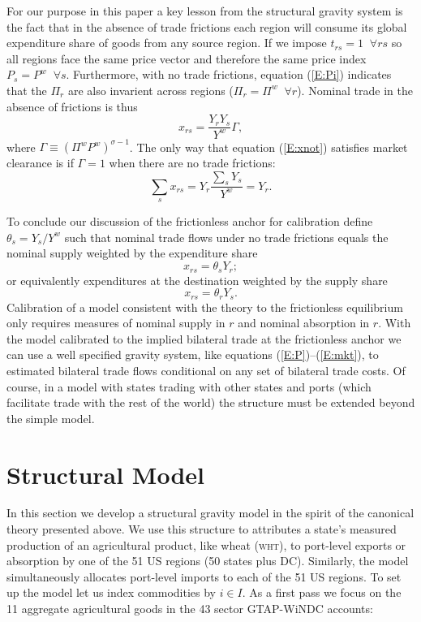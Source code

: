 \documentclass{ejb}
\begin{document}
For our purpose in this paper a key lesson from the structural gravity
system is the fact that in the absence of trade frictions each region
will consume its global expenditure share of goods from any source
region. If we impose $t_{rs}=1 \;\; \forall rs$ so all regions face
the same price vector and therefore the same price index $P_s = P^w
\;\; \forall s$.  Furthermore, with no trade frictions, equation
(\ref{E:Pi}) indicates that the $\Pi_r$ are also invarient across
regions ($\Pi_r = \Pi^w \;\; \forall r$). Nominal trade in the 
absence of frictions is thus 
\begin{equation}
\label{E:xnot}
x_{rs} = \frac{Y_r Y_s}{Y^w} \Gamma,
\end{equation}
where $\Gamma \equiv (\Pi^w P^w)^{\sigma-1}$.  The only way that
equation (\ref{E:xnot}) satisfies market clearance is if $\Gamma = 1$
when there are no trade frictions:
\[\sum_s x_{rs} = Y_r \frac{\sum_s Y_s}{Y^w} = Y_r.\]

To conclude our discussion of the frictionless anchor for calibration
define $\theta_s = Y_s/Y^w$ such that nominal trade flows under no
trade frictions equals the nominal supply weighted by the expenditure
share
\begin{equation}
x_{rs} = \theta_s Y_r;
\end{equation}
or equivalently expenditures at the destination weighted by the supply
share
\begin{equation}
x_{rs} = \theta_r Y_s.
\end{equation}
Calibration of a model consistent with the theory to the frictionless
equilibrium only requires measures of nominal supply in $r$ and
nominal absorption in $r$.  With the model calibrated to the implied
bilateral trade at the frictionless anchor we can use a well
specified gravity system, 
like equations (\ref{E:P})--(\ref{E:mkt}), to estimated bilateral 
trade flows conditional on any set of bilateral trade costs.  Of
course, in a model with states trading with other states and ports
(which facilitate trade with the rest of the world) the structure
must be extended beyond the simple \citet{AvW} model.   

\section{Structural Model}
\label{model}
In this section we develop a structural gravity model in the spirit of
the canonical theory presented above.  We use this structure to 
attributes a state's measured production of an agricultural product,
like wheat (\textsc{wht}), to port-level exports or absorption by one
of the 51 US regions (50 states plus DC).  Similarly, the model
simultaneously allocates port-level imports to each of the 51 US
regions.  To set up the model let us index commodities by $i \in I$.
As a first pass we focus on the 11 aggregate agricultural goods in
the 43 sector GTAP-WiNDC accounts:
\end{document}
